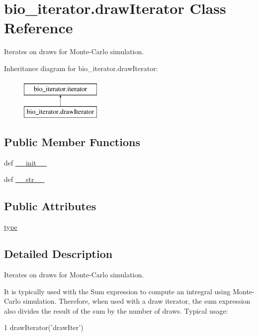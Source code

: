 \hypertarget{classbio__iterator_1_1draw_iterator}{\section{bio\+\_\+iterator.\+draw\+Iterator Class Reference}
\label{classbio__iterator_1_1draw_iterator}
}


Iterates on draws for Monte-\/\+Carlo simulation.  


Inheritance diagram for bio\+\_\+iterator.\+draw\+Iterator\+:\begin{figure}[H]
\begin{center}
\leavevmode
\includegraphics[height=2.000000cm]{d8/df9/classbio__iterator_1_1draw_iterator}
\end{center}
\end{figure}
\subsection*{Public Member Functions}
\begin{DoxyCompactItemize}
\item 
def \hyperlink{classbio__iterator_1_1draw_iterator_a79fe2a20ca20b27dfa8ac758ddd9cfcf}{\+\_\+\+\_\+init\+\_\+\+\_\+}
\item 
def \hyperlink{classbio__iterator_1_1draw_iterator_a95ab2d72ea2c6a28197d3435313fea62}{\+\_\+\+\_\+str\+\_\+\+\_\+}
\end{DoxyCompactItemize}
\subsection*{Public Attributes}
\begin{DoxyCompactItemize}
\item 
\hyperlink{classbio__iterator_1_1draw_iterator_af13b88c8537770df935ae2d30bcb0f41}{type}
\end{DoxyCompactItemize}


\subsection{Detailed Description}
Iterates on draws for Monte-\/\+Carlo simulation. 

It is typically used with the Sum expression to compute an intregral using Monte-\/\+Carlo simulation. Therefore, when used with a draw iterator, the sum expression also divides the result of the sum by the number of draws. Typical usage\+: 
\begin{DoxyCode}
1 drawIterator(\textcolor{stringliteral}{'drawIter'})
\end{DoxyCode}
 

